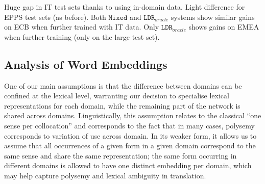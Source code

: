 \documentclass[a4paper]{article}
\newcommand{\jcTodo}[1]{\Todo[JC:]{\textcolor{orange}{#1}}}
\begin{document}
\begin{table}[!h]
\begin{center}
\end{center}
\caption{BPE-detokenized BLEU scores for the Transformer architecture for varying domain-specific embedding sizes \label{tab:add}}
\end{table}

Huge gap in IT test sets thanks to using in-domain data.
Light difference for EPPS test sets (as before).
Both $\mathtt{Mixed}$ and $\mathtt{LDR}_{oracle}$ systems show similar gains on ECB when further trained with IT data.
Only $\mathtt{LDR}_{oracle}$ shows gains on EMEA when further training (only on the large test set).
\jcTodo{rewrite this part}

\subsection{Analysis of Word Embeddings \label{ssec:word_embeddings}}
One of our main assumptions is that the difference between domains can be confined at the lexical level, warranting our decision to specialise lexical representations for each domain, while the remaining part of the network is shared across domains. Linguistically, this assumption relates to the classical ``one sense per collocation'' \cite{Yarowsky93onesense} and corresponds to the fact that in many cases, polysemy corresponds to variation of use across domain. In its weaker form, it allows us to assume that all occurrences of a given form in a given domain correspond to the same sense and share the same representation; the same form occurring in different domains is allowed to have one distinct embedding per domain, which may help capture polysemy and lexical ambiguity in translation. 
\end{document}

